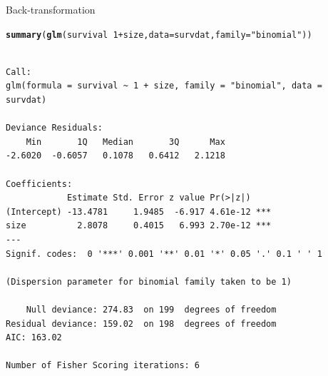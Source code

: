 \documentclass{beamer}\usepackage[]{graphicx}\usepackage[]{color}
\makeatletter
\newcommand{\hlnum}[1]{\textcolor[rgb]{0.686,0.059,0.569}{#1}}%
\newcommand{\hlstr}[1]{\textcolor[rgb]{0.192,0.494,0.8}{#1}}%
\newcommand{\hlopt}[1]{\textcolor[rgb]{0,0,0}{#1}}%
\newcommand{\hlstd}[1]{\textcolor[rgb]{0.345,0.345,0.345}{#1}}%
\newcommand{\hlkwc}[1]{\textcolor[rgb]{0.333,0.667,0.333}{#1}}%
\newcommand{\hlkwd}[1]{\textcolor[rgb]{0.737,0.353,0.396}{\textbf{#1}}}%
\newenvironment{kframe}{%
 \def\at@end@of@kframe{}%
 \ifinner\ifhmode%
  \def\at@end@of@kframe{\end{minipage}}%
  \begin{minipage}{\columnwidth}%
 \fi\fi%
 \def\FrameCommand##1{\hskip\@totalleftmargin \hskip-\fboxsep
 \colorbox{shadecolor}{##1}\hskip-\fboxsep
     \hskip-\linewidth \hskip-\@totalleftmargin \hskip\columnwidth}%
 \MakeFramed {\advance\hsize-\width
   \@totalleftmargin\z@ \linewidth\hsize
   \@setminipage}}%
 {\par\unskip\endMakeFramed%
 \at@end@of@kframe}
\newenvironment{knitrout}{}{} %
\makeatother
\begin{document}
\begin{frame}[fragile]{Back-transformation}


\begin{knitrout}\footnotesize
{}\color{fgcolor}\begin{kframe}
\begin{alltt}
\hlkwd{summary}\hlstd{(}\hlkwd{glm}\hlstd{(survival} \hlopt{~} \hlnum{1} \hlopt{+} \hlstd{size,} \hlkwc{data} \hlstd{= survdat,} \hlkwc{family} \hlstd{=} \hlstr{"binomial"}\hlstd{))}
\end{alltt}
\begin{verbatim}

Call:
glm(formula = survival ~ 1 + size, family = "binomial", data = survdat)

Deviance Residuals: 
    Min       1Q   Median       3Q      Max  
-2.6020  -0.6057   0.1078   0.6412   2.1218  

Coefficients:
            Estimate Std. Error z value Pr(>|z|)    
(Intercept) -13.4781     1.9485  -6.917 4.61e-12 ***
size          2.8078     0.4015   6.993 2.70e-12 ***
---
Signif. codes:  0 '***' 0.001 '**' 0.01 '*' 0.05 '.' 0.1 ' ' 1

(Dispersion parameter for binomial family taken to be 1)

    Null deviance: 274.83  on 199  degrees of freedom
Residual deviance: 159.02  on 198  degrees of freedom
AIC: 163.02

Number of Fisher Scoring iterations: 6
\end{verbatim}
\end{kframe}
\end{knitrout}

\end{frame}
\end{document}
